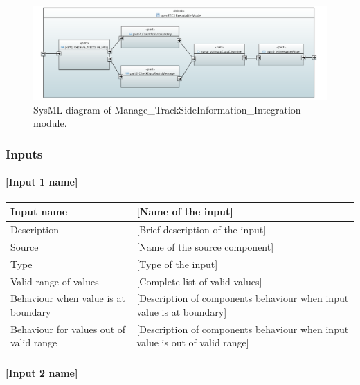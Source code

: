 \begin{figure}
\center
\includegraphics[width=\textwidth]{./images/Input-Messages4.PNG}
\caption{SysML diagram of Manage\_TrackSideInformation\_Integration module.}\label{f:receiveAndCheckConsistencyArch}
\end{figure}


\subsubsection{Inputs}\label{s:Manage_Trackside_inputs}

\paragraph{[Input 1 name]}

\begin{longtable}{p{}p{}}
\toprule
Input name				& [Name of the input] \\
\midrule
Description				& [Brief description of the input] \\
\midrule
Source					& [Name of the source component] \\ 
\midrule
Type					& [Type of the input] \\
\midrule
Valid range of values	& [Complete list of valid values] \\
\midrule
Behaviour when value is at boundary	& [Description of components behaviour when input value is at boundary] \\
\midrule
Behaviour for values out of valid range	& [Description of components behaviour when input value is out of valid range] \\
\bottomrule
\end{longtable}


\paragraph{[Input 2 name]}

